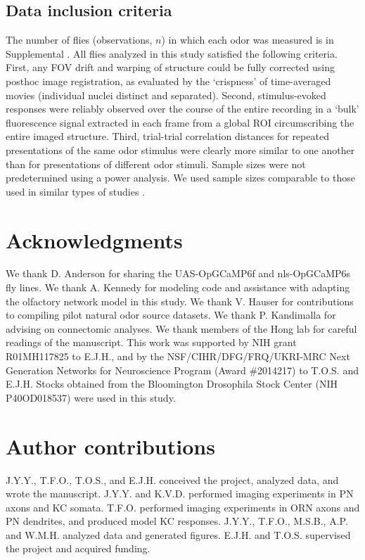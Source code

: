 \documentclass[12pt]{caltech_thesis}
\renewcommand{\cite}{{ }\autocite}
\let\Oldsection\section
\renewcommand{\section}{\FloatBarrier\Oldsection}
\let\Oldsubsection\subsection
\renewcommand{\subsection}{\FloatBarrier\Oldsubsection}
\begin{document}
\begin{refsection}
\subsection{Data inclusion criteria}
The number of flies (observations, $n$) in which each odor was measured is in Supplemental .
All flies analyzed in this study satisfied the following criteria.
First, any FOV drift and warping of structure could be fully corrected using posthoc image registration, as evaluated by the `crispness' of time-averaged movies (individual nuclei distinct and separated).
Second, stimulus-evoked responses were reliably observed over the course of the entire recording in a `bulk' fluorescence signal extracted in each frame from a global ROI circumscribing the entire imaged structure.
Third, trial-trial correlation distances for repeated presentations of the same odor stimulus were clearly more similar to one another than for presentations of different odor stimuli.
Sample sizes were not predetermined using a power analysis.
We used sample sizes comparable to those used in similar types of studies\cite{CorticalOdorSpace,Endo2020}.

\section{Acknowledgments}
We thank D. Anderson for sharing the UAS-OpGCaMP6f and nls-OpGCaMP6s fly lines.
We thank A. Kennedy for modeling code and assistance with adapting the olfactory network model in this study.
We thank V. Hauser for contributions to compiling pilot natural odor source datasets.
We thank P. Kandimalla for advising on connectomic analyses.
We thank members of the Hong lab for careful readings of the manuscript.
This work was supported by NIH grant R01MH117825 to E.J.H., and by the NSF/CIHR/DFG/FRQ/UKRI-MRC Next Generation Networks for Neuroscience Program (Award \#2014217) to T.O.S. and E.J.H.
Stocks obtained from the Bloomington Drosophila Stock Center (NIH P40OD018537) were used in this study.

\section{Author contributions}
J.Y.Y., T.F.O., T.O.S., and E.J.H. conceived the project, analyzed data, and wrote the manuscript.
J.Y.Y. and K.V.D. performed imaging experiments in PN axons and KC somata.
T.F.O. performed imaging experiments in ORN axons and PN dendrites, and produced model KC responses.
J.Y.Y., T.F.O., M.S.B., A.P. and W.M.H. analyzed data and generated figures.
E.J.H. and T.O.S. supervised the project and acquired funding.

\ReferencesSection
\end{refsection}
\end{document}
